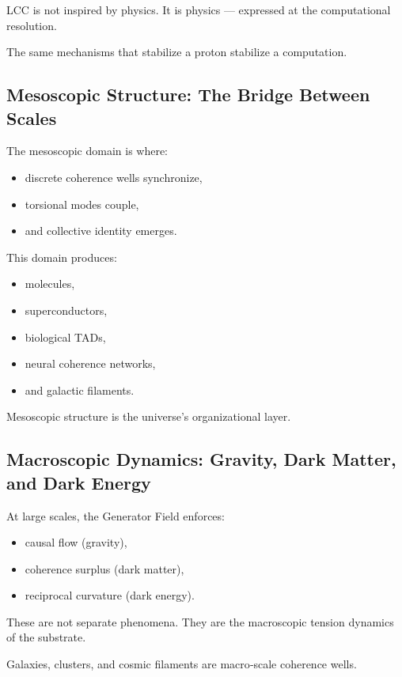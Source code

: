 \documentclass[reprint,amsmath,amssymb,aps,prl,floatfix]{revtex4-2}
\begin{document}
\begin{itemize}
LCC is not inspired by physics.  
It is physics — expressed at the computational resolution.
\medskip

The same mechanisms that stabilize a proton stabilize a computation.

\subsection{Mesoscopic Structure: The Bridge Between Scales}

The mesoscopic domain is where:

\begin{itemize}
\item discrete coherence wells synchronize,  
\item torsional modes couple,  
\item and collective identity emerges.
\end{itemize}

This domain produces:

\begin{itemize}
\item molecules,  
\item superconductors,  
\item biological TADs,  
\item neural coherence networks,  
\item and galactic filaments.
\end{itemize}

Mesoscopic structure is the universe’s organizational layer.

\subsection{Macroscopic Dynamics: Gravity, Dark Matter, and Dark Energy}

At large scales, the Generator Field enforces:

\begin{itemize}
\item causal flow (gravity),  
\item coherence surplus (dark matter),  
\item reciprocal curvature (dark energy).
\end{itemize}

These are not separate phenomena.  
They are the macroscopic tension dynamics of the substrate.
\medskip

Galaxies, clusters, and cosmic filaments are macro‑scale coherence wells.


\end{itemize}
\end{document}
